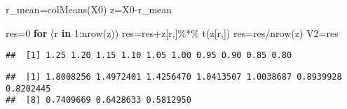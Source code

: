 \documentclass[
]{article}
\newenvironment{Shaded}{\begin{snugshade}}{\end{snugshade}}
\newcommand{\ControlFlowTok}[1]{\textcolor[rgb]{0.13,0.29,0.53}{\textbf{#1}}}
\newcommand{\DecValTok}[1]{\textcolor[rgb]{0.00,0.00,0.81}{#1}}
\newcommand{\FunctionTok}[1]{\textcolor[rgb]{0.00,0.00,0.00}{#1}}
\newcommand{\NormalTok}[1]{#1}
\newcommand{\OtherTok}[1]{\textcolor[rgb]{0.56,0.35,0.01}{#1}}
\newcommand{\SpecialCharTok}[1]{\textcolor[rgb]{0.00,0.00,0.00}{#1}}
\begin{document}
\begin{Shaded}
\begin{Highlighting}[]
\NormalTok{r\_mean}\OtherTok{=}\FunctionTok{colMeans}\NormalTok{(X0)}
\NormalTok{z}\OtherTok{=}\NormalTok{X0}\SpecialCharTok{{-}}\NormalTok{r\_mean}
\end{Highlighting}
\end{Shaded}

\begin{Shaded}
\begin{Highlighting}[]
\NormalTok{res}\OtherTok{=}\DecValTok{0}
\ControlFlowTok{for}\NormalTok{ (r }\ControlFlowTok{in} \DecValTok{1}\SpecialCharTok{:}\FunctionTok{nrow}\NormalTok{(z))}
\NormalTok{  res}\OtherTok{=}\NormalTok{res}\SpecialCharTok{+}\NormalTok{z[r,]}\SpecialCharTok{\%*\%} \FunctionTok{t}\NormalTok{(z[r,])}
\NormalTok{  res}\OtherTok{=}\NormalTok{res}\SpecialCharTok{/}\FunctionTok{nrow}\NormalTok{(z)}
\NormalTok{V2}\OtherTok{=}\NormalTok{res}
\end{Highlighting}
\end{Shaded}

\begin{Shaded}
\end{Shaded}

\begin{verbatim}
##  [1] 1.25 1.20 1.15 1.10 1.05 1.00 0.95 0.90 0.85 0.80
\end{verbatim}

\begin{Shaded}
\end{Shaded}

\begin{verbatim}
##  [1] 1.8008256 1.4972401 1.4256470 1.0413507 1.0038687 0.8939928 0.8202445
##  [8] 0.7409669 0.6428633 0.5812950
\end{verbatim}
\end{document}
